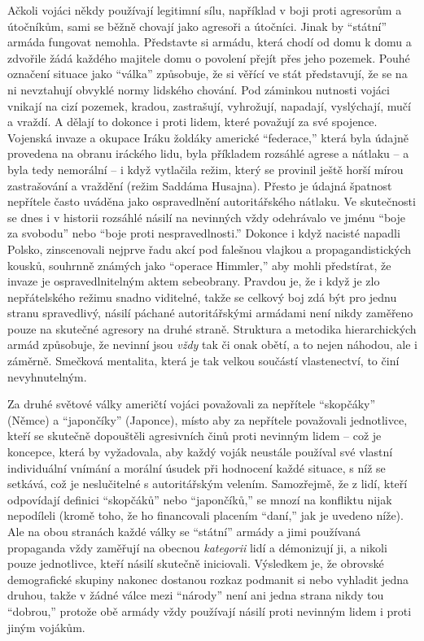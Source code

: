 \documentclass{book}
\begin{document}
Ačkoli vojáci někdy používají legitimní sílu, například v boji proti agresorům a útočníkům, sami se běžně chovají jako agresoři a útočníci. Jinak by \enquote{státní} armáda fungovat nemohla. Představte si armádu, která chodí od domu k domu a zdvořile žádá každého majitele domu o povolení přejít přes jeho pozemek. Pouhé označení situace jako \enquote{válka} způsobuje, že si věřící ve stát představují, že se na ni nevztahují obvyklé normy lidského chování. Pod záminkou nutnosti vojáci vnikají na cizí pozemek, kradou, zastrašují, vyhrožují, napadají, vyslýchají, mučí a vraždí. A dělají to dokonce i proti lidem, které považují za své spojence. Vojenská invaze a okupace Iráku žoldáky americké \enquote{federace,} která byla údajně provedena na obranu iráckého lidu, byla příkladem rozsáhlé agrese a nátlaku -- a byla tedy nemorální -- i když vytlačila režim, který se provinil ještě horší mírou zastrašování a vraždění (režim Saddáma Husajna). Přesto je údajná špatnost nepřítele často uváděna jako ospravedlnění autoritářského nátlaku. Ve skutečnosti se dnes i v historii rozsáhlé násilí na nevinných vždy odehrávalo ve jménu \enquote{boje za svobodu} nebo \enquote{boje proti nespravedlnosti.} Dokonce i když nacisté napadli Polsko, zinscenovali nejprve řadu akcí pod falešnou vlajkou a propagandistických kousků, souhrnně známých jako \enquote{operace Himmler,} aby mohli předstírat, že invaze je ospravedlnitelným aktem sebeobrany. Pravdou je, že i když je zlo nepřátelského režimu snadno viditelné, takže se celkový boj zdá být pro jednu stranu spravedlivý, násilí páchané autoritářskými armádami není nikdy zaměřeno pouze na skutečné agresory na druhé straně. Struktura a metodika hierarchických armád způsobuje, že nevinní jsou \emph{vždy} tak či onak obětí, a to nejen náhodou, ale i záměrně. Smečková mentalita, která je tak velkou součástí vlastenectví, to činí nevyhnutelným.

Za druhé světové války američtí vojáci považovali za nepřítele \enquote{skopčáky} (Němce) a \enquote{japončíky} (Japonce), místo aby za nepřítele považovali jednotlivce, kteří se skutečně dopouštěli agresivních činů proti nevinným lidem -- což je koncepce, která by vyžadovala, aby každý voják neustále používal své vlastní individuální vnímání a morální úsudek při hodnocení každé situace, s níž se setkává, což je neslučitelné s autoritářským velením. Samozřejmě, že z lidí, kteří odpovídají definici \enquote{skopčáků} nebo \enquote{japončíků,} se mnozí na konfliktu nijak nepodíleli (kromě toho, že ho financovali placením \enquote{daní,} jak je uvedeno níže). Ale na obou stranách každé války se \enquote{státní} armády a jimi používaná propaganda vždy zaměřují na obecnou \emph{kategorii} lidí a démonizují ji, a nikoli pouze jednotlivce, kteří násilí skutečně iniciovali. Výsledkem je, že obrovské demografické skupiny nakonec dostanou rozkaz podmanit si nebo vyhladit jedna druhou, takže v žádné válce mezi \enquote{národy} není ani jedna strana nikdy tou \enquote{dobrou,} protože obě armády vždy používají násilí proti nevinným lidem i proti jiným vojákům.
\end{document}
